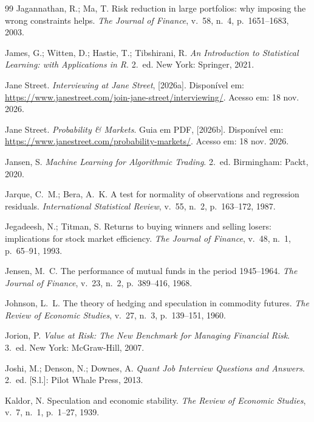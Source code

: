 \begin{thebibliography}{99}
Jagannathan, R.; Ma, T. Risk reduction in large portfolios: why imposing the wrong constraints helps. \emph{The Journal of Finance}, v.~58, n.~4, p.~1651--1683, 2003.

James, G.; Witten, D.; Hastie, T.; Tibshirani, R. \emph{An Introduction to Statistical Learning: with Applications in R}. 2.~ed. New York: Springer, 2021.

Jane Street. \emph{Interviewing at Jane Street}, [2026a]. Disponível em: \url{https://www.janestreet.com/join-jane-street/interviewing/}. Acesso em: 18 nov. 2026.

Jane Street. \emph{Probability \& Markets}. Guia em PDF, [2026b]. Disponível em: \url{https://www.janestreet.com/probability-markets/}. Acesso em: 18 nov. 2026.

Jansen, S. \emph{Machine Learning for Algorithmic Trading}. 2.~ed. Birmingham: Packt, 2020.

Jarque, C.~M.; Bera, A.~K. A test for normality of observations and regression residuals. \emph{International Statistical Review}, v.~55, n.~2, p.~163--172, 1987.

Jegadeesh, N.; Titman, S. Returns to buying winners and selling losers: implications for stock market efficiency. \emph{The Journal of Finance}, v.~48, n.~1, p.~65--91, 1993.

Jensen, M.~C. The performance of mutual funds in the period 1945--1964. \emph{The Journal of Finance}, v.~23, n.~2, p.~389--416, 1968.

Johnson, L.~L. The theory of hedging and speculation in commodity futures. \emph{The Review of Economic Studies}, v.~27, n.~3, p.~139--151, 1960.

Jorion, P. \emph{Value at Risk: The New Benchmark for Managing Financial Risk}. 3.~ed. New York: McGraw-Hill, 2007.

Joshi, M.; Denson, N.; Downes, A. \emph{Quant Job Interview Questions and Answers}. 2.~ed. [S.l.]: Pilot Whale Press, 2013.

Kaldor, N. Speculation and economic stability. \emph{The Review of Economic Studies}, v.~7, n.~1, p.~1--27, 1939.


\end{thebibliography}
